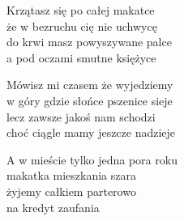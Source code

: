 \begin{text}
    Krzątasz się po całej makatce\\
    że w bezruchu cię nie uchwycę\\
    do krwi masz powyszywane palce\\
    a pod oczami smutne księżyce

    Mówisz mi czasem że wyjedziemy\\
    w góry gdzie słońce pszenice sieje\\
    lecz zawsze jakoś nam schodzi\\
    choć ciągle mamy jeszcze nadzieje

    A w mieście tylko jedna pora roku\\
    makatka mieszkania szara\\
    żyjemy całkiem parterowo\\
    na kredyt zaufania
\end{text}
\begin{chord}

\end{chord}